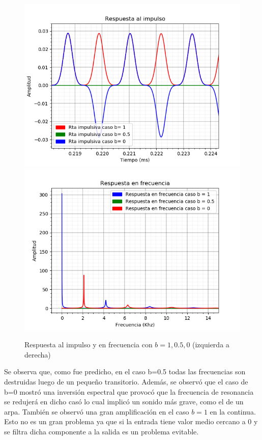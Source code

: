 \documentclass[assd_tp2_main.tex]{subfiles}
\begin{document}
\begin{figure}[H]
	\begin{center}
	\includegraphics[scale=0.5]{graficos/impulsoB.png}
	\includegraphics[scale=0.5]{graficos/rtaFreqB.png}
	\caption{Respuesta al impulso y en frecuencia con $b=1, 0.5, 0$ (izquierda a derecha)}

	\end{center}
\end{figure}

Se observa que, como fue predicho, en el caso b=0.5 todas las frecuencias son destruidas luego de un pequeño transitorio. Además, se observó que el caso de b=0 mostró una inversión espectral que provocó que la frecuencia de resonancia se redujerá en dicho casó lo cual implicó un sonido más grave, como el de un arpa.
También se observó una gran amplificación en el caso $b=1$ en la continua. Esto no es un gran problema ya que si la entrada tiene valor medio cercano a 0 y se filtra dicha componente a la salida es un problema evitable.
\end{document}
